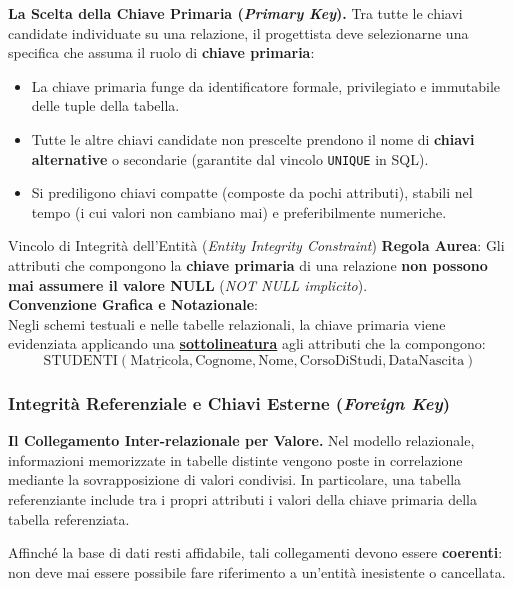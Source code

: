 \documentclass[12pt]{extarticle}
\begin{document}
\medskip
\noindent \textbf{La Scelta della Chiave Primaria (\textit{Primary Key}).} Tra tutte le chiavi candidate individuate su una relazione, il progettista deve selezionarne una specifica che assuma il ruolo di \textbf{chiave primaria}:
\begin{itemize}
    \item La chiave primaria funge da identificatore formale, privilegiato e immutabile delle tuple della tabella.
    \item Tutte le altre chiavi candidate non prescelte prendono il nome di \textbf{chiavi alternative} o secondarie (garantite dal vincolo \texttt{UNIQUE} in SQL).
    \item Si prediligono chiavi compatte (composte da pochi attributi), stabili nel tempo (i cui valori non cambiano mai) e preferibilmente numeriche.
\end{itemize}

\begin{cbox}{Vincolo di Integrità dell'Entità (\textit{Entity Integrity Constraint})}
\noindent \textbf{Regola Aurea}: Gli attributi che compongono la \textbf{chiave primaria} di una relazione \textbf{non possono mai assumere il valore NULL} (\textit{NOT NULL implicito}). \\

\noindent \textbf{Convenzione Grafica e Notazionale}: \\
Negli schemi testuali e nelle tabelle relazionali, la chiave primaria viene evidenziata applicando una \textbf{\underline{sottolineatura}} agli attributi che la compongono:
$$\text{STUDENTI}(\underline{\text{Matricola}}, \text{Cognome}, \text{Nome}, \text{CorsoDiStudi}, \text{DataNascita})$$
\end{cbox}

\subsubsection{Integrità Referenziale e Chiavi Esterne (\textit{Foreign Key})}
\noindent \textbf{Il Collegamento Inter-relazionale per Valore.} Nel modello relazionale, informazioni memorizzate in tabelle distinte vengono poste in correlazione mediante la sovrapposizione di valori condivisi. In particolare, una tabella referenziante include tra i propri attributi i valori della chiave primaria della tabella referenziata.

\medskip
\noindent Affinché la base di dati resti affidabile, tali collegamenti devono essere \textbf{coerenti}: non deve mai essere possibile fare riferimento a un'entità inesistente o cancellata.
\end{document}
